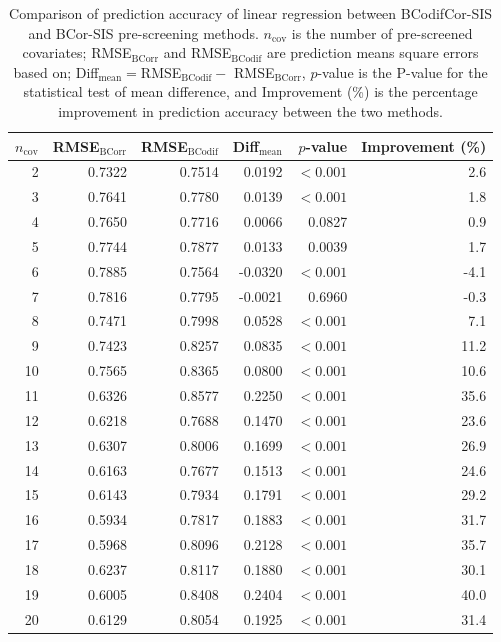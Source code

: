 \documentclass[11pt]{article}
\theoremstyle{definition}
\begin{document}
\begin{table}[!t]
\centering
\caption{Comparison of prediction accuracy of linear regression between BCodifCor-SIS and BCor-SIS pre-screening methods. $n_{\mathrm{cov}}$ is the number of pre-screened covariates; RMSE$_{\mathrm{BCorr}}$ and  RMSE$_{\mathrm{BCodif}}$ are prediction means square errors based on; Diff$_{\mathrm{mean}}=$RMSE$_{\mathrm{BCodif}}-$ RMSE$_{\mathrm{BCorr}}$,
$p$-value is the P-value for the statistical test of mean difference, and Improvement (\%) is the percentage improvement in prediction accuracy between the two methods.}
\label{Riboflavin}
\begin{tabular}{rrrrrr}
\toprule
$n_{\mathrm{cov}}$ & RMSE$_{\mathrm{BCorr}}$ & RMSE$_{\mathrm{BCodif}}$ &
Diff$_{\mathrm{mean}}$ & $p$-value & Improvement (\%) \\
\midrule
2  & 0.7322 & 0.7514 &  0.0192 & $<0.001$ &  2.6 \\
3  & 0.7641 & 0.7780 &  0.0139 & $<0.001$ &  1.8 \\
4  & 0.7650 & 0.7716 &  0.0066 & 0.0827   &  0.9 \\
5  & 0.7744 & 0.7877 &  0.0133 & 0.0039   &  1.7 \\
6  & 0.7885 & 0.7564 & -0.0320 & $<0.001$ & -4.1 \\
7  & 0.7816 & 0.7795 & -0.0021 & 0.6960   & -0.3 \\
8  & 0.7471 & 0.7998 &  0.0528 & $<0.001$ &  7.1 \\
9  & 0.7423 & 0.8257 &  0.0835 & $<0.001$ & 11.2 \\
10 & 0.7565 & 0.8365 &  0.0800 & $<0.001$ & 10.6 \\
11 & 0.6326 & 0.8577 &  0.2250 & $<0.001$ & 35.6 \\
12 & 0.6218 & 0.7688 &  0.1470 & $<0.001$ & 23.6 \\
13 & 0.6307 & 0.8006 &  0.1699 & $<0.001$ & 26.9 \\
14 & 0.6163 & 0.7677 &  0.1513 & $<0.001$ & 24.6 \\
15 & 0.6143 & 0.7934 &  0.1791 & $<0.001$ & 29.2 \\
16 & 0.5934 & 0.7817 &  0.1883 & $<0.001$ & 31.7 \\
17 & 0.5968 & 0.8096 &  0.2128 & $<0.001$ & 35.7 \\
18 & 0.6237 & 0.8117 &  0.1880 & $<0.001$ & 30.1 \\
19 & 0.6005 & 0.8408 &  0.2404 & $<0.001$ & 40.0 \\
20 & 0.6129 & 0.8054 &  0.1925 & $<0.001$ & 31.4 \\

\end{tabular}
\end{table}
\end{document}
